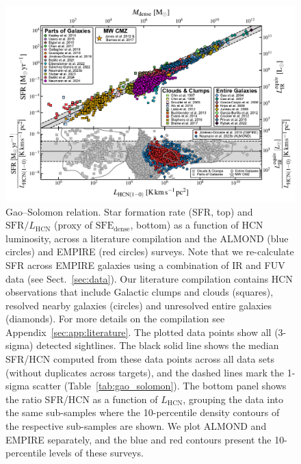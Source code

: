 \documentclass[letter, longauth]{aa} %
\newcommand*{\lhcn}{\ensuremath{L_{\text{HCN}}}\xspace}  %
\newcommand*{\sfedense}{\ensuremath{\text{SFE}_{\text{dense}}}\xspace}  %
\begin{document}
\begin{figure}
\centering
\includegraphics[width=\textwidth]{Figures/GS_relation_literature_compilation_compressed.pdf}
\caption{Gao--Solomon relation. Star formation rate (SFR, top) and $\mathrm{SFR}/\lhcn$ (proxy of \sfedense, bottom) as a function of HCN luminosity, across a literature compilation and the ALMOND (blue circles) and EMPIRE (red circles) surveys.
Note that we re-calculate SFR across EMPIRE galaxies using a combination of IR and FUV data (see Sect.~\ref{sec:data}).
Our literature compilation contains HCN observations that include Galactic clumps and clouds (squares), resolved nearby galaxies (circles) and unresolved entire galaxies (diamonds).
For more details on the compilation see Appendix~\ref{sec:app:literature}.
The plotted data points show all (3-sigma) detected sightlines.
The black solid line shows the median SFR/HCN computed from these data points across all data sets (without duplicates across targets), and the dashed lines mark the 1-sigma scatter (Table~\ref{tab:gao_solomon}).
The bottom panel shows the ratio SFR/HCN as a function of \lhcn, grouping the data into the same sub-samples where the 10-percentile density contours of the respective sub-samples are shown.
We plot ALMOND and EMPIRE separately, and the blue and red contours present the 10-percentile levels of these surveys.
}
\label{fig:gao_solomon_relation}
\end{figure}
\end{document}
